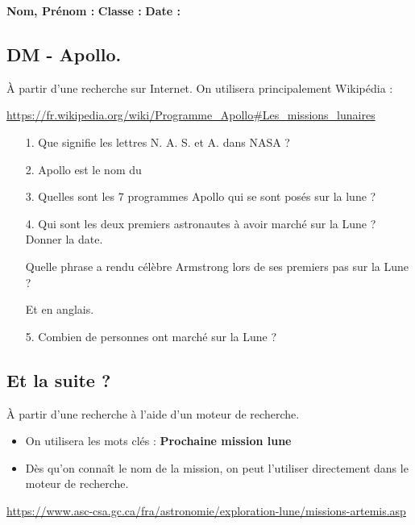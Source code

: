 



\textbf{Nom, Prénom :} \hspace{8cm} \textbf{Classe :} \hspace{3cm} \textbf{Date :}\\

\subsection*{DM - Apollo.}

À partir d'une recherche sur Internet. On utilisera principalement Wikipédia :

\url{https://fr.wikipedia.org/wiki/Programme_Apollo#Les_missions_lunaires}


\begin{enumerate}
  \item[1.]Que signifie les lettres N. A. S. et A. dans NASA ? \\
  \Pointilles[2]

  \item[2.]Apollo est le nom du \dotfill
  
  \item[3.]Quelles sont les 7 programmes Apollo qui se sont posés sur la lune ? \\
  \Pointilles[4]

  \item[4.]Qui sont les deux premiers astronautes à avoir marché sur la Lune ? Donner la date.\\
  \Pointilles[1]

  Quelle phrase a rendu célèbre Armstrong lors de ses premiers pas sur la Lune ? \\
  \Pointilles[2]

  Et en anglais. \\
  \Pointilles[2]

  \item[5.]Combien de personnes ont marché sur la Lune ? \\
  \Pointilles[3]
\end{enumerate}

\subsection*{Et la suite ?}

À partir d'une recherche à l'aide d'un moteur de recherche. 

\begin{itemize}
  \item On utilisera les mots clés : \textbf{Prochaine mission lune}
  \item Dès qu'on connaît le nom de la mission, on peut l'utiliser directement dans le moteur de recherche.
\end{itemize}
\url{https://www.asc-csa.gc.ca/fra/astronomie/exploration-lune/missions-artemis.asp}

